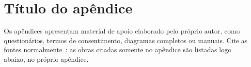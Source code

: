 \documentclass[tcc,capa]{texifsap}
\begin{document}



\apendices
\chapter{Título do apêndice}

\begin{referenciasapendice}
Os apêndices apresentam material de apoio elaborado pelo próprio autor,
como questionários, termos de consentimento, diagramas completos ou
manuais. Cite as fontes normalmente~\cite{Knuth:1984}: as obras citadas
somente no apêndice são listadas logo abaixo, no próprio apêndice.
\end{referenciasapendice}
\end{document}

